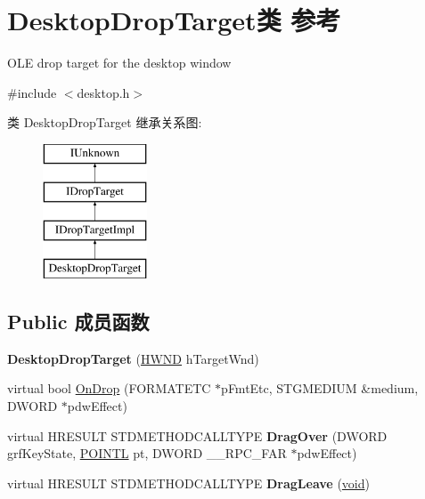 \hypertarget{class_desktop_drop_target}{}\section{Desktop\+Drop\+Target类 参考}
\label{class_desktop_drop_target}


O\+LE drop target for the desktop window  




{\ttfamily \#include $<$desktop.\+h$>$}

类 Desktop\+Drop\+Target 继承关系图\+:\begin{figure}[H]
\begin{center}
\leavevmode
\includegraphics[height=4.000000cm]{class_desktop_drop_target}
\end{center}
\end{figure}
\subsection*{Public 成员函数}
\begin{DoxyCompactItemize}
\item 
\mbox{\label{class_desktop_drop_target_abae1e1eabea999ade0bf9854640e98ba}} 
{\bfseries Desktop\+Drop\+Target} (\hyperlink{interfacevoid}{H\+W\+ND} h\+Target\+Wnd)
\item 
virtual bool \hyperlink{class_desktop_drop_target_a050c71c0454ff7eb0cf726f9c4d0c804}{On\+Drop} (F\+O\+R\+M\+A\+T\+E\+TC $\ast$p\+Fmt\+Etc, S\+T\+G\+M\+E\+D\+I\+UM \&medium, D\+W\+O\+RD $\ast$pdw\+Effect)
\item 
\mbox{\label{class_desktop_drop_target_adc400c617f6a712d5641db942b7e463e}} 
virtual H\+R\+E\+S\+U\+LT S\+T\+D\+M\+E\+T\+H\+O\+D\+C\+A\+L\+L\+T\+Y\+PE {\bfseries Drag\+Over} (D\+W\+O\+RD grf\+Key\+State, \hyperlink{struct___p_o_i_n_t_l}{P\+O\+I\+N\+TL} pt, D\+W\+O\+RD \+\_\+\+\_\+\+R\+P\+C\+\_\+\+F\+AR $\ast$pdw\+Effect)
\item 
\mbox{\label{class_desktop_drop_target_a86bff202e9fe8746a37289ff73fec538}} 
virtual H\+R\+E\+S\+U\+LT S\+T\+D\+M\+E\+T\+H\+O\+D\+C\+A\+L\+L\+T\+Y\+PE {\bfseries Drag\+Leave} (\hyperlink{interfacevoid}{void})
\end{DoxyCompactItemize}

